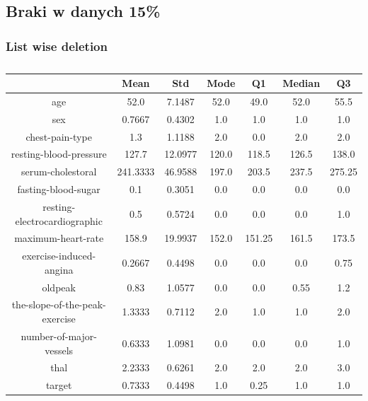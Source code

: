 \documentclass{classrep}
\begin{document}
{{{            }
        }
        \newpage

        \subsection{Braki w danych 15\%}
        \label{results:15-percent} {

            \subsubsection{List wise deletion}
            \label{results:15-percent:list-wise} {
                \begin{table}[!htbp]
                    \centering
                    \begin{tabular}{|c|c|c|c|c|c|c|}
                        \hline
                        & Mean & Std & Mode & Q1 & Median & Q3 \\ \hline
                        age & 52.0 & 7.1487 & 52.0 & 49.0 & 52.0 & 55.5 \\ \hline
                        sex & 0.7667 & 0.4302 & 1.0 & 1.0 & 1.0 & 1.0 \\ \hline
                        chest-pain-type & 1.3 & 1.1188 & 2.0 & 0.0 & 2.0 & 2.0 \\ \hline
                        resting-blood-pressure & 127.7 & 12.0977 & 120.0 & 118.5 & 126.5 & 138.0 \\ \hline
                        serum-cholestoral & 241.3333 & 46.9588 & 197.0 & 203.5 & 237.5 & 275.25 \\ \hline
                        fasting-blood-sugar & 0.1 & 0.3051 & 0.0 & 0.0 & 0.0 & 0.0 \\ \hline
                        resting-electrocardiographic & 0.5 & 0.5724 & 0.0 & 0.0 & 0.0 & 1.0 \\ \hline
                        maximum-heart-rate & 158.9 & 19.9937 & 152.0 & 151.25 & 161.5 & 173.5 \\ \hline
                        exercise-induced-angina & 0.2667 & 0.4498 & 0.0 & 0.0 & 0.0 & 0.75 \\ \hline
                        oldpeak & 0.83 & 1.0577 & 0.0 & 0.0 & 0.55 & 1.2 \\ \hline
                        the-slope-of-the-peak-exercise & 1.3333 & 0.7112 & 2.0 & 1.0 & 1.0 & 2.0 \\ \hline
                        number-of-major-vessels & 0.6333 & 1.0981 & 0.0 & 0.0 & 0.0 & 1.0 \\ \hline
                        thal & 2.2333 & 0.6261 & 2.0 & 2.0 & 2.0 & 3.0 \\ \hline
                        target & 0.7333 & 0.4498 & 1.0 & 0.25 & 1.0 & 1.0 \\ \hline
                    \end{tabular}
                    \caption{}
                    \label{result_15_List-wise-deletion}
                \end{table}
                \FloatBarrier

}}}
\end{document}
